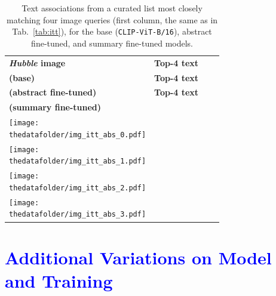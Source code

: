 \documentclass[10pt]{article} %
\newcommand{\hubble}{\emph{Hubble}\xspace}
\newcommand{\changes}[1]{\textcolor{blue}{#1}}
\begin{document}
\begin{table}[t!]
  \centering
  \renewcommand{\arraystretch}{0.1}
  \begin{tabular}{m{3cm} m{3.9cm} m{3.9cm} m{3.9cm}}
      \toprule
      \centering \bfseries \hubble image & \centering \textbf{Top-4 text} \\ \textbf{\textcolor{deeppurple}{(base)}} & \centering  \textbf{Top-4 text} \\ \textbf{\textcolor{deepblue}{(abstract fine-tuned)}} & \centering  \textbf{Top-4 text} \\ \textbf{\textcolor{deepred}{(summary fine-tuned)}} \tabularnewline
      \midrule
      \centering \texttt{[image: \\thedatafolder/img\_itt\_abs\_0.pdf]} & \centering \scriptsize  & \centering  \scriptsize  &  {\scriptsize } \tabularnewline
      \midrule
      \centering \texttt{[image: \\thedatafolder/img\_itt\_abs\_1.pdf]} & \centering \scriptsize  & \centering  \scriptsize  &  {\scriptsize } \tabularnewline
      \midrule
      \centering \texttt{[image: \\thedatafolder/img\_itt\_abs\_2.pdf]} & \centering \scriptsize  & \centering  \scriptsize  &  {\scriptsize } \tabularnewline
      \midrule
      \centering \texttt{[image: \\thedatafolder/img\_itt\_abs\_3.pdf]} & \centering \scriptsize  & \centering  \scriptsize  &  {\scriptsize } \tabularnewline
      \bottomrule
  \end{tabular}
  \caption{Text associations from a curated list most closely matching four image queries (first column, the same as in Tab.~\ref{tab:itt}), for the \textcolor{deeppurple}{base} (\texttt{CLIP-ViT-B/16}), \textcolor{deepblue}{abstract fine-tuned}, and \textcolor{deepred}{summary fine-tuned} models.}
  \label{tab:itt_abs}
\end{table}

\section{\changes{Additional Variations on Model and Training}}
\label{app:ablations}
\end{document}
